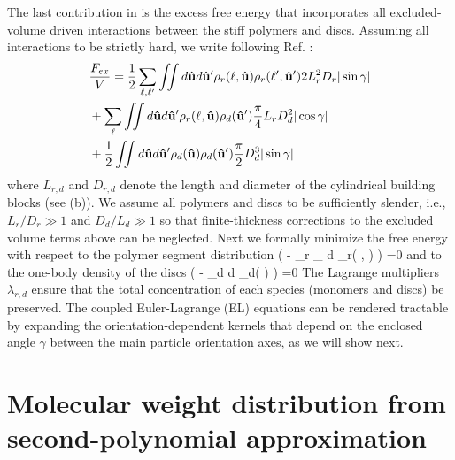 The last contribution in  is the excess free energy that incorporates all excluded-volume driven interactions between the stiff polymers and discs. Assuming all interactions to be strictly hard, we write following Ref. \cite{stroobants1984}:
\begin{align}
& \frac{F_{ex}}{ V}  =  \frac{1}{2}   \sum_{\ell, \ell^{\prime}}  \iint d  {\bf \hat{u}}  d {\bf \hat{u}}^{\prime} \rho_{r}(\ell, {\bf \hat{u}})  \rho_{r}(\ell^{\prime}, {\bf \hat{u}}^{\prime})  2  L_{r}^{2} D_{r}  | \sin \gamma |  \nonumber \\
& +    \sum_{\ell}  \iint d  {\bf \hat{u}}  d {\bf \hat{u}}^{\prime} \rho_{r}(\ell, {\bf \hat{u}}) \rho_{d}( {\bf \hat{u}}^{\prime})  \frac{\pi}{4}  L_{r} D_{d}^{2}  | \cos \gamma |  \nonumber \\
& +  \frac{1}{2} \iint d  {\bf \hat{u}}  d {\bf \hat{u}}^{\prime} \rho_{d}( {\bf \hat{u}}) \rho_{d}( {\bf \hat{u}}^{\prime})  \frac{\pi}{2} D_{d}^{3}  | \sin \gamma |  
\label{fex}
\end{align}
where $L_{r,d}$ and $D_{r,d}$ denote the length and diameter of the cylindrical building blocks (see (b)).  We assume all polymers and discs to be sufficiently slender, i.e., $L_{r}/D_{r} \gg 1$ and $D_{d}/L_{d} \gg 1$ so that finite-thickness corrections to the excluded volume terms above can be neglected.   Next we formally minimize the free energy with respect to the polymer segment distribution
\beq
{} \left (  - \lambda_{r} \sum_{  \ell} \int d \oma \rho_{r}( \ell, \oma ) \right ) =0
\label{el1}
\eeq
and to the one-body density of the discs
\beq
{} \left (  - \lambda_{d}  \int d \oma \rho_{d}(  \oma ) \right ) =0
\label{el2}
\eeq
The Lagrange multipliers $\lambda_{r,d}$ ensure that the total concentration of each species (monomers and discs) be preserved.  The coupled Euler-Lagrange (EL) equations can be rendered tractable by expanding the orientation-dependent kernels that depend on the enclosed angle $\gamma$ between the main particle orientation axes, as we will show next.


\section[Molecular weight distribution]{Molecular weight distribution from second-polynomial approximation}

